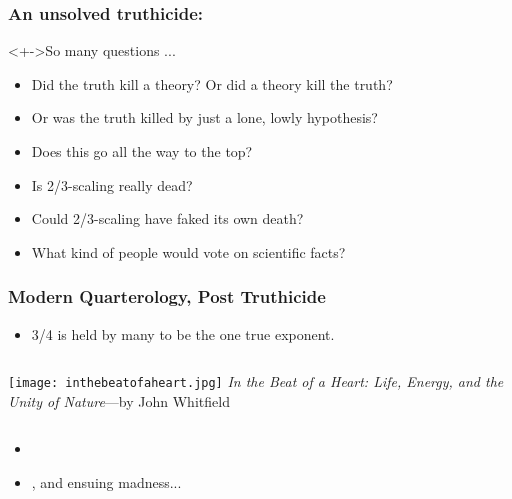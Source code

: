 \begin{frame}
  \frametitle{An unsolved truthicide:}

  \begin{block}<+->{So many questions ...}
    \begin{itemize}
    \item<+-> 
      Did the truth kill a theory?  Or did a theory kill the truth?
    \item<+-> 
      Or was the truth killed by just a lone, lowly hypothesis?
    \item<+-> 
      Does this go all the way to the top?\\ 
    \item<+-> 
      Is 2/3-scaling really dead?
    \item<+-> 
      Could 2/3-scaling have faked its own death?
    \item<+-> 
      What kind of people would vote on scientific facts?
    \end{itemize}
  \end{block}

\end{frame}

\begin{frame}
  \frametitle{Modern Quarterology, Post Truthicide}

  \begin{block}{}
  \begin{itemize}
  \item 3/4 is held by many to be the one true exponent.
  \end{itemize}

  \bigskip 

  \begin{columns}
    \texttt{[image: inthebeatofaheart.jpg]}
    \textit{In the Beat of a Heart: Life, Energy, and the Unity of Nature}---by John Whitfield
  \end{columns}

  \bigskip 

  \begin{itemize}
  \item<2-> 
  \item<3-> 
    , and ensuing madness...
  \end{itemize}
  \end{block}




\end{frame}


